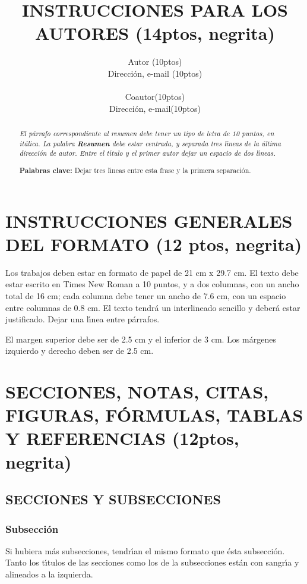 \documentclass{article}
\title{INSTRUCCIONES PARA LOS AUTORES (14ptos, negrita)}
\author{Autor (10ptos)\\Direcci\'{o}n, e-mail (10ptos) \\ \\ Coautor(10ptos)\\ Direcci\'{o}n, e-mail(10ptos)}
\begin{document}
\maketitle

\begin{abstract}
{\em El párrafo correspondiente al resumen debe tener un tipo de
letra de 10 puntos, en it\'{a}lica. La palabra {\bf Resumen} debe
estar centrada, y separada tres l\'{\i}neas de la \'{u}ltima
direcci\'{o}n de autor. Entre el t\'{\i}tulo y el primer autor dejar
un espacio de dos l\'{\i}neas.}

{\bf Palabras clave:} Dejar tres l\'{\i}neas entre esta frase y la primera
separaci\'{o}n.\\
\end{abstract}

\section{INSTRUCCIONES GENERALES DEL FORMATO (12 ptos, negrita)}
Los trabajos deben estar en formato de papel de 21 cm x 29.7 cm.
El texto debe estar escrito en Times New Roman a 10 puntos, y a dos
columnas, con un ancho total de 16 cm; cada columna debe tener
un ancho de 7.6 cm, con un espacio entre columnas de 0.8 cm. El texto
tendr\'{a} un interlineado sencillo y deber\'{a} estar justificado. Dejar
una l\'{\i}nea entre p\'{a}rrafos.

El margen superior debe ser de 2.5 cm y el inferior de 3 cm. Los m\'{a}rgenes
izquierdo y derecho deben ser de 2.5 cm.

\section{SECCIONES, NOTAS, CITAS, FIGURAS, F\'{O}RMULAS, TABLAS Y REFERENCIAS (12ptos, negrita)}

\subsection{SECCIONES Y SUBSECCIONES}

\subsubsection{Subsecci\'{o}n}

Si hubiera m\'{a}s subsecciones, tendr\'{\i}an el mismo formato que \'{e}sta subsecci\'{o}n.
Tanto los t\'{\i}tulos de las secciones como los de la subsecciones est\'{a}n con
sangr\'{\i}a y alineados a la izquierda.
\end{document}
